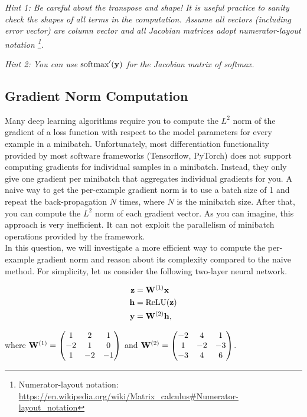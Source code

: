\documentclass[11pt]{article}
\begin{document}
        \noindent \emph{Hint 1: Be careful about the transpose and shape! It is useful practice to sanity check the shapes of all terms in the computation. Assume all vectors (including error vector) are column vector and all Jacobian matrices adopt numerator-layout notation \footnote{Numerator-layout notation: \url{https://en.wikipedia.org/wiki/Matrix_calculus\#Numerator-layout_notation}}.}
        
        \noindent \emph{Hint 2: You can use $\text{softmax}^\prime(\mathbf{y})$ for the Jacobian matrix of softmax.}
        
        
        
\subsection{Gradient Norm Computation}
Many deep learning algorithms require you to compute the $L^2$ norm of the gradient of a loss function with respect to the model parameters for every example in a minibatch. Unfortunately, most differentiation functionality provided by most software frameworks (Tensorflow, PyTorch) does not support computing gradients for individual samples in a minibatch. Instead, they only give one gradient per minibatch that aggregates individual gradients for you. A naive way to get the per-example gradient norm is to use a batch size of 1 and repeat the back-propagation $N$ times, where $N$ is the minibatch size. After that, you can compute the $L^2$ norm of each gradient vector. As you can imagine, this approach is very inefficient. It can not exploit the parallelism of minibatch operations provided by the framework. \\

In this question, we will investigate a more efficient way to compute the per-example gradient norm and reason about its complexity compared to the naive method. For simplicity, let us consider the following two-layer neural network.

\begin{align*}
    \mathbf{z} &= \mathbf{W}^{(1)} {\bf x} \\
    \mathbf{h} &= \textnormal{ReLU}(\mathbf{z}) \\
    \mathbf{y} &= \mathbf{W}^{(2)} \mathbf{h},\\
\end{align*}

\noindent where $\mathbf{W}^{(1)} = \begin{pmatrix}
            1 & 2 & 1 \\
            -2 & 1 & 0 \\
            1 & -2 & -1 \\
            \end{pmatrix}$
and $\mathbf{W}^{(2)} = \begin{pmatrix}
            -2 & 4 & 1\\
            1 & -2 & -3\\
            -3 & 4 & 6
            \end{pmatrix}$.
\end{document}
